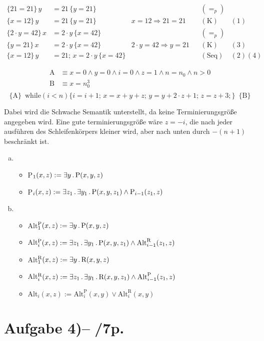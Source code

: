 


\date{Donnerstag 9.1.2020}


\maketitle
\thispagestyle{fancy}

\begin{align}
	\{21=21\}\, y &= 21\,  \{y=21\} & & & (=_p) \\
	\{x=12\}\, y &= 21\,  \{y=21\} & x=12 \Rightarrow 21 = 21 && (\text{K})&(1) \\
	\{2\cdot y = 42\}\, x &= 2\cdot y\,  \{x=42\} & & & (=_p) \\
	\{y=21\}\, x &= 2\cdot y\,  \{x=42\} & 2\cdot y = 42 \Rightarrow y = 21 && (\text{K})&(3) \\
	\{x=12\}\, y &= 21;\, x = 2\cdot y\,  \{x=42\} & & & (\text{Seq})&(2)(4) 
\end{align}

\begin{align*}
	\text{A} &\equiv x = 0 \land y = 0 \land i = 0 \land z = 1 \land n = n_0 \land n > 0 \\
	\text{B} &\equiv x = n_0^3\\
\end{align*}
$$ \{\text{A}\}\,\,\, \text{while}(i < n) \{i=i+1;\,x=x+y+z;\,y=y+2 \cdot z + 1;\,z=z+3;\}\,\,\, \{\text{B}\} $$

Dabei wird die Schwache Semantik unterstellt, da keine Terminierungsgröße 
angegeben wird. Eine gute terminierungsgröße wäre $z=-i$, die nach jeder ausführen 
des Schleifenkörpers kleiner wird, aber nach unten durch $-(n+1)$ beschränkt ist.
\begin{enumerate}[a)]
	\item \begin{itemize}
		\item P$_1(x,z) := \exists y \, . \, \text{P}(x,y,z)$
		\item P$_i(x,z) := \exists z_1 \, . \,\exists y_1 \, . \, \text{P}(x,y,z_1) \land \text{P}_{i-1}(z_1,z)$
	\end{itemize}
	\item \begin{itemize}
		\item Alt$^\text{P}_1(x,z) := \exists y \, . \, \text{P}(x,y,z)$
		\item Alt$^\text{P}_i(x,z) := \exists z_1 \, . \,\exists y_1 \, . \, \text{P}(x,y,z_1) \land \text{Alt}^\text{R}_{i-1}(z_1,z)$
		\item Alt$^\text{R}_1(x,z) := \exists y \, . \, \text{R}(x,y,z)$
		\item Alt$^\text{R}_i(x,z) := \exists z_1 \, . \,\exists y_1 \, . \, \text{R}(x,y,z_1) \land \text{Alt}^\text{P}_{i-1}(z_1,z)$
		\item Alt$_i(x,z) := \text{Alt}^\text{P}_i(x,y) \lor \text{Alt}^\text{R}_i(x,y) $
	\end{itemize}
\end{enumerate}
\section*{Aufgabe 4)\hfill –\,\,/7p.}


\vfill\centering

